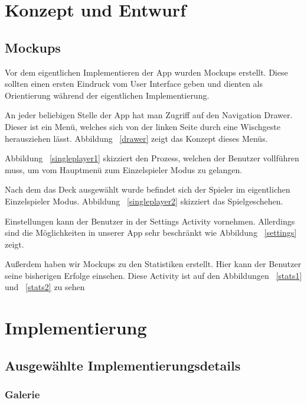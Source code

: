 \documentclass{scrartcl}
\begin{document}
\section{Konzept und Entwurf}
\subsection{Mockups}
Vor dem eigentlichen Implementieren der App wurden Mockups erstellt. Diese
sollten einen ersten Eindruck vom User Interface geben und dienten als
Orientierung während der eigentlichen Implementierung.

An jeder beliebigen Stelle der App hat man Zugriff auf den Navigation Drawer.
Dieser ist ein Menü, welches sich von der linken Seite durch eine Wischgeste
herausziehen lässt. Abbildung ~\ref{drawer} zeigt das Konzept dieses Menüs.

Abbildung ~\ref{singleplayer1} skizziert den Prozess, welchen der Benutzer
vollführen muss, um vom Hauptmenü zum Einzelspieler Modus zu gelangen.

Nach dem das Deck ausgewählt wurde befindet sich der Spieler im eigentlichen
Einzelspieler Modus. Abbildung ~\ref{singleplayer2} skizziert das
Spielgeschehen.

Einstellungen kann der Benutzer in der Settings Activity vornehmen. Allerdings
sind die Möglichkeiten in unserer App sehr beschränkt wie Abbildung
~\ref{settings} zeigt.

Außerdem haben wir Mockups zu den Statistiken erstellt. Hier kann der Benutzer
seine bisherigen Erfolge einsehen. Diese Activity ist auf den Abbildungen
~\ref{stats1} und ~\ref{stats2} zu sehen


\clearpage

\section{Implementierung}
\subsection{Ausgewählte Implementierungsdetails}
\subsubsection{Galerie}
\end{document}
